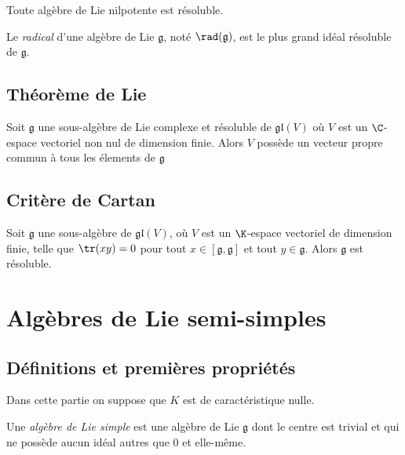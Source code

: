 \omitted

\begin{proposition}
    Toute algèbre de Lie nilpotente est résoluble.
\end{proposition}

\omitted

\begin{definition}
    Le \emph{radical} d'une algèbre de Lie $\mathfrak{g}$, noté $\rad(\mathfrak{g})$, est le plus grand idéal résoluble de $\mathfrak{g}$.
\end{definition}

\subsection{Théorème de Lie}

\begin{theorem}
    Soit $\mathfrak{g}$ une sous-algèbre de Lie complexe et résoluble de $\mathfrak{gl}(V)$ où $V$ est un $\C$-espace vectoriel non nul de dimension finie. Alors $V$ possède un vecteur propre commun à tous les élements de $\mathfrak{g}$
\end{theorem}

\omitted

\subsection{Critère de Cartan}

\begin{theorem}
    Soit $\mathfrak{g}$ une sous-algèbre de $\mathfrak{gl}(V)$, où $V$ est un $\K$-espace vectoriel de dimension finie, telle que $\tr(xy)=0$ pour tout $x\in [\mathfrak{g}, \mathfrak{g}]$ et tout $y\in\mathfrak{g}$. Alors $\mathfrak{g}$ est résoluble.
\end{theorem}

\omitted

\section{Algèbres de Lie semi-simples}

\subsection{Définitions et premières propriétés}

\noindent Dans cette partie on suppose que $K$ est de caractéristique nulle.

\begin{definition}
    Une \emph{algèbre de Lie simple} est une algèbre de Lie $\mathfrak{g}$ dont le centre est trivial et qui ne possède aucun idéal autres que $0$ et elle-même.
\end{definition}

